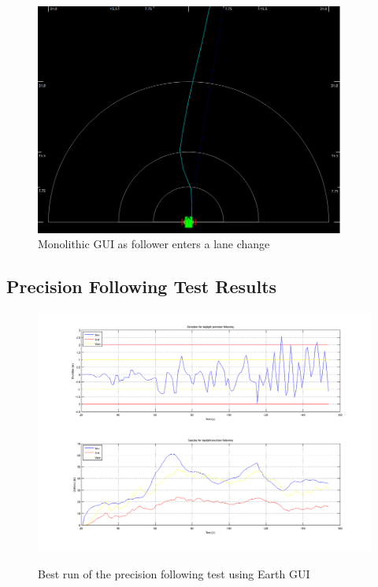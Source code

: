 \begin{figure}[ht] \centering
    \includegraphics[width=4in]{./figs/lane_change_mono.png}
    \caption{Monolithic GUI as follower enters a lane change} \label{fig:lanechange_mono}
\end{figure}


\subsection{Precision Following Test Results} \label{sec:precisionfollowingresults}

\begin{figure}[ht] \centering \label{fig:precisionresults_earth}
    \includegraphics[width=5in]{./figs/dst_dev_earth_tracklap.png}
    \caption{Best run of the precision following test using Earth GUI}
\end{figure}

